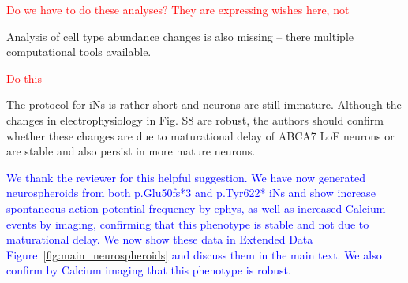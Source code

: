 \textcolor{red}{Do we have to do these analyses? They are expressing wishes here, not }

Analysis of cell type abundance changes is also missing – there multiple computational tools available.

\textcolor{red}{Do this}

The protocol for iNs is rather short and neurons are still immature. Although the changes in electrophysiology in Fig. S8 are robust, the authors should confirm whether these changes are due to maturational delay of ABCA7 LoF neurons or are stable and also persist in more mature neurons.

\textcolor{blue}{We thank the reviewer for this helpful suggestion. We have now generated neurospheroids from both p.Glu50fs*3 and p.Tyr622* iNs and show increase spontaneous action potential frequency by ephys, as well as increased Calcium events by imaging, confirming that this phenotype is stable and not due to maturational delay. We now show these data in Extended Data Figure~\ref{fig:main_neurospheroids} and discuss them in the main text. We also confirm by Calcium imaging that this phenotype is robust.}

